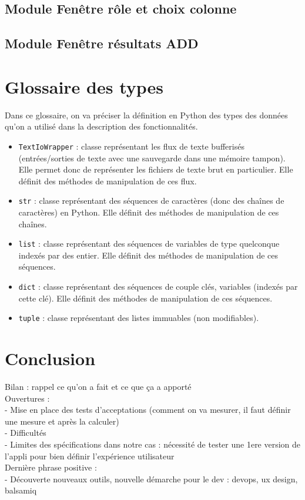 		\subsection{Module Fenêtre rôle et choix colonne}

		\subsection{Module Fenêtre résultats ADD}
	
	\section{Glossaire des types}
	
	Dans ce glossaire, on va préciser la définition en Python des types des données qu'on a utilisé dans la description des fonctionnalités.
	\begin{itemize}
		\item \lstinline!TextIoWrapper! : classe représentant les flux de texte bufferisés (entrées/sorties de texte avec une sauvegarde dans une mémoire tampon). Elle permet donc de représenter les fichiers de texte brut en particulier. Elle définit des méthodes de manipulation de ces flux.
		\item \lstinline!str! : classe représentant des séquences de caractères (donc des chaînes de caractères) en Python. Elle définit des méthodes de manipulation de ces chaînes.
		\item \lstinline!list! : classe représentant des séquences de variables de type quelconque indexés par des entier. Elle définit des méthodes de manipulation de ces séquences.		
		\item \lstinline!dict! : classe représentant des séquences de couple clés, variables (indexés par cette clé). Elle définit des méthodes de manipulation de ces séquences.		
		\item \lstinline!tuple! : classe représentant des listes immuables (non modifiables).
	\end{itemize}
	
	\section*{Conclusion}
		Bilan : rappel ce qu'on a fait et ce que ça a apporté\\
		Ouvertures :\\
			- Mise en place des tests d'acceptations (comment on va mesurer, il faut définir une mesure et après la calculer)\\
			- Difficultés\\
			- Limites des spécifications dans notre cas : nécessité de tester une 1ere version de l'appli pour bien définir l'expérience utilisateur\\
		Dernière phrase positive :\\
			- Découverte nouveaux outils, nouvelle démarche pour le dev : devops, ux design, balsamiq
		

